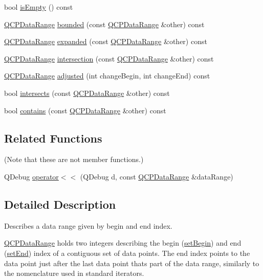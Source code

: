 \begin{DoxyCompactItemize}
\item 
bool \hyperlink{classQCPDataRange_ac32e53fc05d6cd2eac96b96a7265d3b8}{is\+Empty} () const
\item 
\hyperlink{classQCPDataRange}{Q\+C\+P\+Data\+Range} \hyperlink{classQCPDataRange_a93529421d12fdd3a8bdb2b8061936352}{bounded} (const \hyperlink{classQCPDataRange}{Q\+C\+P\+Data\+Range} \&other) const
\item 
\hyperlink{classQCPDataRange}{Q\+C\+P\+Data\+Range} \hyperlink{classQCPDataRange_a36c8ad8acf177ffeb0a72c8d73030844}{expanded} (const \hyperlink{classQCPDataRange}{Q\+C\+P\+Data\+Range} \&other) const
\item 
\hyperlink{classQCPDataRange}{Q\+C\+P\+Data\+Range} \hyperlink{classQCPDataRange_a84e1e03129dd52528efb4bac18d30183}{intersection} (const \hyperlink{classQCPDataRange}{Q\+C\+P\+Data\+Range} \&other) const
\item 
\hyperlink{classQCPDataRange}{Q\+C\+P\+Data\+Range} \hyperlink{classQCPDataRange_a279ed36602b39607699dc5652bcaf813}{adjusted} (int change\+Begin, int change\+End) const
\item 
bool \hyperlink{classQCPDataRange_a8a1c437f9beffd55621f48f961d7f679}{intersects} (const \hyperlink{classQCPDataRange}{Q\+C\+P\+Data\+Range} \&other) const
\item 
bool \hyperlink{classQCPDataRange_a13ca398776374a3160aa85433718b812}{contains} (const \hyperlink{classQCPDataRange}{Q\+C\+P\+Data\+Range} \&other) const
\end{DoxyCompactItemize}
\subsection*{Related Functions}
(Note that these are not member functions.) \begin{DoxyCompactItemize}
\item 
Q\+Debug \hyperlink{classQCPDataRange_a486dd7af8a090ed069672e3510e6a082}{operator$<$$<$} (Q\+Debug d, const \hyperlink{classQCPDataRange}{Q\+C\+P\+Data\+Range} \&data\+Range)
\end{DoxyCompactItemize}


\subsection{Detailed Description}
Describes a data range given by begin and end index. 

\hyperlink{classQCPDataRange}{Q\+C\+P\+Data\+Range} holds two integers describing the begin (\hyperlink{classQCPDataRange_a54ff59048e01e46ac4aefafc844626c6}{set\+Begin}) and end (\hyperlink{classQCPDataRange_a277f1a9eafe70b9184d9c00b641ae5de}{set\+End}) index of a contiguous set of data points. The end index points to the data point just after the last data point that\textquotesingle{}s part of the data range, similarly to the nomenclature used in standard iterators.

